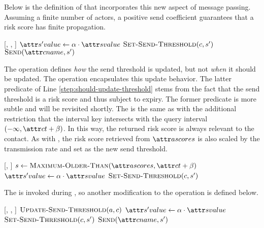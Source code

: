 Below is the definition of \cApplyRiskScore{} that incorporates this new aspect of message passing. Assuming a finite number of actors, a positive send coefficient guarantees that a risk score has finite propagation.

\begin{function}{\nApplyRiskScore}[\vActor, \vContact, \vScore]
  \If{$\aContactThresholdValue < \aScoreValue \AND \aContactTime + \pTimeBuffer > \aScoreTime$}
    \State $\aNewScoreValue \assign \pTransmissionRate \cdot \aScoreValue$
    \State $\cSetSendThreshold[\vContact, \vNewScore]$
    \State $\cSend[\aContactName, \vNewScore]$
  \EndIf
\end{function}

The \cSetSendThreshold{} operation defines \emph{how} the send threshold is updated, but not \emph{when} it should be updated. The \cUpdateSendThreshold{} operation encapsulates this update behavior. The latter predicate of Line \ref{step:should-update-threshold} stems from the fact that the send threshold is a risk score and thus subject to expiry. The former predicate is more subtle and will be revisited shortly. The \cMaximumOlderThan{} is the same as \cMaximum{} with the additional restriction that the interval key intersects with the query interval $(-\infty, \aContactTime + \pTimeBuffer)$. In this way, the returned risk score is always relevant to the contact. As with \cApplyRiskScore{}, the risk score retrieved from $\aActorScores$ is also scaled by the transmission rate and set as the new send threshold.

\begin{function}{\nUpdateSendThreshold}[\vActor, \vContact]
   \label{step:should-update-threshold}
    \State $\vScore \assign \cMaximumOlderThan[\aActorScores, \aContactTime + \pTimeBuffer]$
    \State $\aNewScoreValue \assign \pTransmissionRate \cdot \aScoreValue$
    \State $\cSetSendThreshold[\vContact, \vNewScore]$
  \EndIf
\end{function}

The \cUpdateSendThreshold{} is invoked during \cApplyRiskScore{}, so another modification to the operation is defined below.

\begin{function}{\nApplyRiskScore}[\vActor, \vContact, \vScore]
  \State $\cUpdateSendThreshold[\vActor, \vContact]$
  \If{$\aContactThresholdValue < \aScoreValue \AND \aContactTime + \pTimeBuffer > \aScoreTime$}
    \State $\aNewScoreValue \assign \pTransmissionRate \cdot \aScoreValue$
    \State $\cSetSendThreshold[\vContact, \vNewScore]$
    \State $\cSend[\aContactName, \vNewScore]$
  \EndIf
\end{function}

